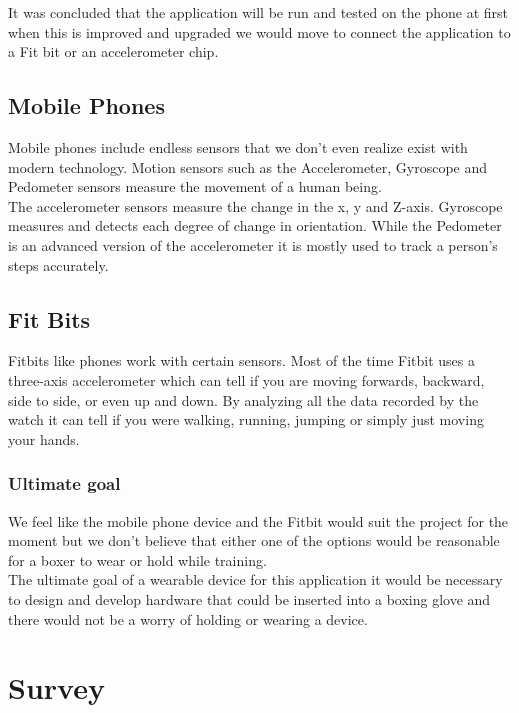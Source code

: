 \documentclass[a4paper,12pt]{report}
\begin{document}
It was concluded that the application will be run and tested on the phone at first when this is improved and upgraded we would move to connect the application to a Fit bit or an accelerometer chip.

\subsection{Mobile Phones}
Mobile phones include endless sensors that we don't even realize exist with modern technology.
Motion sensors such as the Accelerometer, Gyroscope and Pedometer sensors measure the movement of a human being. \\

The accelerometer sensors measure the change in the x, y and Z-axis. Gyroscope measures and detects each degree of change in orientation. While the Pedometer is an advanced version of the accelerometer it is mostly used to track a person's steps accurately.\cite{sensorsPhone}   

\subsection{Fit Bits}

Fitbits like phones work with certain sensors. Most of the time Fitbit uses a three-axis accelerometer which can tell if you are moving forwards, backward, side to side, or even up and down.
By analyzing all the data recorded by the watch it can tell if you were walking, running, jumping or simply just moving your hands.\cite{sensorsFitbit}

\subsubsection{Ultimate goal}
We feel like the mobile phone device and the Fitbit would suit the project for the moment but we don't believe that either one of the options would be reasonable for a boxer to wear or hold while training.\\

The ultimate goal of a wearable device for this application it would be necessary to design and develop hardware that could be inserted into a boxing glove and there would not be a worry of holding or wearing a device.
\newpage
\section{Survey}
\vspace{5mm} %
\end{document}
